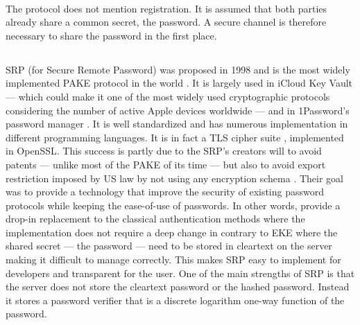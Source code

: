 ﻿\documentclass[../report.tex]{subfiles}
\begin{document}
\paragraph{}
The protocol does not mention registration. It is assumed that both parties already share a common secret, the password. A secure channel is therefore necessary to share the password in the first place.


\subsection{}
\paragraph{}
SRP \cite{SRP_Paper, SRP_6_Paper} (for Secure Remote Password) was proposed in 1998 and is the most widely implemented PAKE protocol in the world \cite{PAKE_Green_blog}.
It is largely used in iCloud Key Vault --- which could make it one of the most widely used cryptographic protocols \cite{PAKE_Green_blog} considering the number of active Apple devices worldwide --- and in 1Password's password manager \cite{SRP_1Password_blog}.
It is well standardized and has numerous implementation in different programming languages. %
It is in fact a TLS cipher suite \cite{SRP_RFC_3}, implemented in OpenSSL.
This success is partly due to the SRP's creators will to avoid patents --- unlike most of the PAKE of its time --- but also to avoid export restriction imposed by US law by not using any encryption schema \cite{SRP_Formal_Analysis}.
Their goal was to provide a technology that improve the security of existing password protocols while keeping the ease-of-use of passwords. In other words, provide a drop-in replacement to the classical authentication methods where the implementation does not require a deep change in contrary to EKE where the shared secret --- the password --- need to be stored in cleartext on the server making it difficult to manage correctly.
This makes SRP easy to implement for developers and transparent for the user.
One of the main strengths of SRP is that the server does not store the cleartext password or the hashed password. Instead it stores a password verifier that is a discrete logarithm one-way function of the password.
\end{document}

